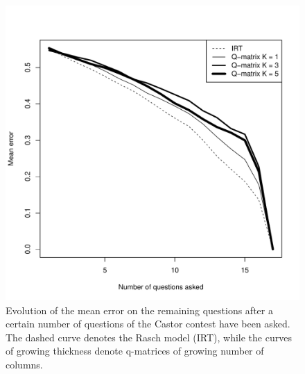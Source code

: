 \documentclass{edm_template}
\begin{document}
\begin{figure}
\includegraphics[width=\linewidth]{castor.pdf}
\caption{Evolution of the mean error on the remaining questions after a certain number of questions of the Castor contest have been asked. The dashed curve denotes the Rasch model (IRT), while the curves of growing thickness denote q-matrices of growing number of columns.}
\label{fig:castor}
\end{figure}
\end{document}
